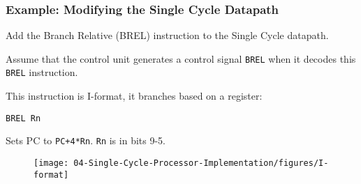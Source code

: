 








\newpage
\begin{frame}[fragile]\frametitle{Example: Modifying the Single Cycle Datapath}

\begin{tcolorbox}[enhanced,attach boxed title to top center={yshift=-3mm,yshifttext=-1mm},
  colback=red!5!white,colframe=red!75!black,colbacktitle=red!80!black,
  title=Try this,fonttitle=\bfseries,
  boxed title style={size=small,colframe=red!50!black} ]
Add the Branch Relative (BREL) instruction to the Single Cycle datapath.

Assume that the control unit generates a control signal \texttt{BREL} when it decodes this {\tt BREL} instruction.
\hfill\break

This instruction is I-format, it branches based on a register:
\begin{verbatim}
BREL Rn
\end{verbatim}
Sets PC to \texttt{PC+4*Rn}. \texttt{Rn} is in bits 9-5.
\begin{figure}[H]
\centering
	{\texttt{[image: 04-Single-Cycle-Processor-Implementation/figures/I-format]}}
\end{figure}
\end{tcolorbox}
\end{frame}

